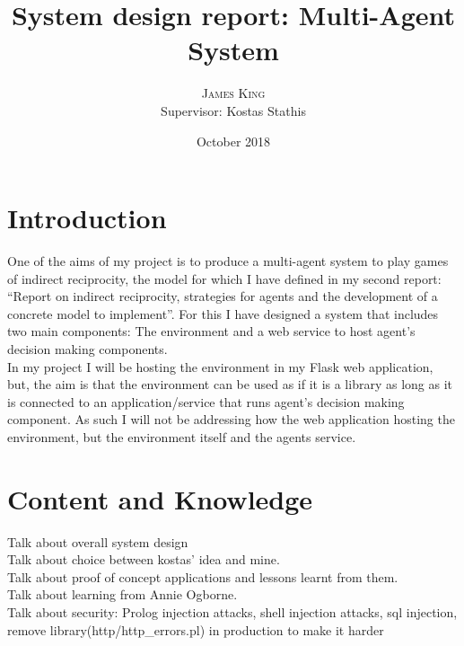 \documentclass[twoside,twocolumn]{article}
\title{System design report: Multi-Agent System} %
\author{%
\textsc{James King} \\%
\normalsize Supervisor: Kostas Stathis \\ %
}
\date{October 2018} %
\begin{document}

\maketitle


\section{Introduction}
One of the aims of my project is to produce a multi-agent system to play games of indirect reciprocity, the model for which I have defined in my second report: ``Report on indirect reciprocity, strategies for agents and the development of a concrete model to implement''. For this I have designed a system that includes two main components: The environment and a web service to host agent's decision making components.\\
In my project I will be hosting the environment in my Flask web application, but, the aim is that the environment can be used as if it is a library as long as it is connected to an application/service that runs agent's decision making component. As such I will not be addressing how the web application hosting the environment, but the environment itself and the agents service.


\section{Content and Knowledge}
Talk about overall system design\\
Talk about choice between kostas' idea and mine.\\
Talk about proof of concept applications and lessons learnt from them.\\
Talk about learning from Annie Ogborne.\\
Talk about security: Prolog injection attacks, shell injection attacks, sql injection, remove library(http/http\_errors.pl) in production to make it harder
\end{document}
